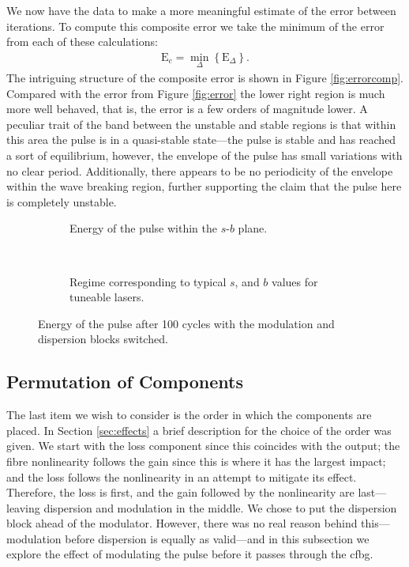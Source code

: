 We now have the data to make a more meaningful estimate of the error between iterations. To compute this composite error we take the minimum of the error from each of these calculations:
\begin{align}
\textrm{E}_c = \min_\Delta \left\{ \textrm{E}_\Delta \right\}.
\label{eq:errorcomp}
\end{align}
The intriguing structure of the composite error is shown in Figure \ref{fig:errorcomp}. Compared with the error from Figure \ref{fig:error} the lower right region is much more well behaved, that is, the error is a few orders of magnitude lower. A peculiar trait of the band between the unstable and stable regions is that within this area the pulse is in a quasi-stable state---the pulse is stable and has reached a sort of equilibrium, however, the envelope of the pulse has small variations with no clear period. Additionally, there appears to be no periodicity of the envelope within the wave breaking region, further supporting the claim that the pulse here is completely unstable. \\

\begin{figure}[p]
\centering
\begin{subfigure}{\textwidth}

\caption{Energy of the pulse within the $s$-$b$ plane.}
\label{fig:switchbig}
\end{subfigure} \\
\begin{subfigure}{\textwidth}

\caption{Regime corresponding to typical $s$, and $b$ values for tuneable lasers.}
\label{fig:switchzoom}
\end{subfigure}
\caption{Energy of the pulse after 100 cycles with the modulation and dispersion blocks switched.}
\label{fig:switch}
\end{figure}

\subsection{Permutation of Components}
The last item we wish to consider is the order in which the components are placed. In Section \ref{sec:effects} a brief description for the choice of the order was given. We start with the loss component since this coincides with the output; the fibre nonlinearity follows the gain since this is where it has the largest impact; and the loss follows the nonlinearity in an attempt to mitigate its effect. Therefore, the loss is first, and the gain followed by the nonlinearity are last---leaving dispersion and modulation in the middle. We chose to put the dispersion block ahead of the modulator. However, there was no real reason behind this---modulation before dispersion is equally as valid---and in this subsection we explore the effect of modulating the pulse before it passes through the \gls{cfbg}. \\

